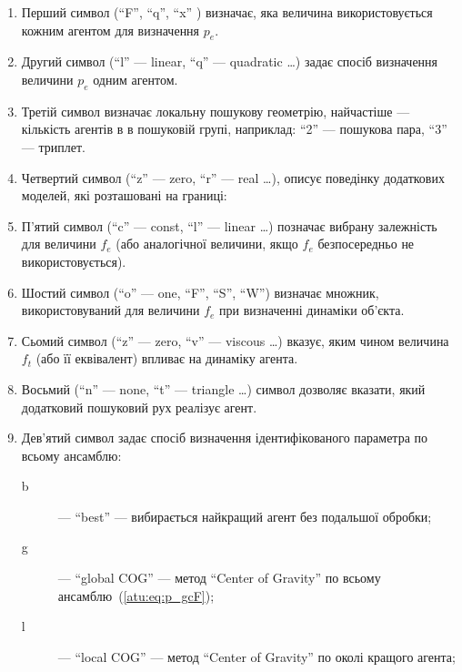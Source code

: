 \documentclass[a4paper,13pt]{atuaref}
\begin{document}
\begin{enumerate}

  \item
  Перший символ (``F'', ``q'', ``x'' ) визначає,
  яка величина використовується кожним агентом для визначення $p_e$.

  \item
    Другий символ (``l'' --- linear, ``q'' --- quadratic \ldots ) 
    задає спосіб визначення величини $p_e$ одним агентом.

  \item
  Третій символ визначає локальну пошукову геометрію, найчастіше --- кількість
    агентів в в пошуковій групі, наприклад: ``2'' --- пошукова пара, ``3'' --- триплет.

  \item
    Четвертий символ (``z'' --- zero, ``r'' --- real \ldots),
    описує поведінку додаткових моделей, які розташовані на границі:

  \item
    П'ятий символ (``c'' --- const, ``l'' --- linear \ldots )
    позначає вибрану залежність для величини $f_e$ (або
    аналогічної величини, якщо $f_e$ безпосередньо не використовується).

  \item
    Шостий символ (``o'' --- one, ``F'', ``S'', ``W'') визначає множник,
    використовуваний для величини $f_e$ при визначенні динаміки об'єкта.

  \item
   Сьомий символ (``z'' --- zero, ``v'' --- viscous \ldots)
    вказує, яким чином величина $f_t$ (або її еквівалент) впливає на динаміку агента.

  \item
   Восьмий (``n'' --- none, ``t'' --- triangle \ldots ) символ дозволяє вказати,
    який додатковий пошуковий рух реалізує агент.

  \item
    Дев'ятий символ задає спосіб визначення ідентифікованого параметра по всьому ансамблю:
    \begin{description}

      \item[b]  --- ``best''
        --- вибирається найкращий агент без подальшої обробки;

      \item[g]  --- ``global COG'' ---
        метод ``Center of Gravity'' по всьому ансамблю~(\ref{atu:eq:p_gcF});

      \item[l] --- ``local COG'' ---
        метод ``Center of Gravity'' по околі кращого агента;


\end{description}
\end{enumerate}
\end{document}

